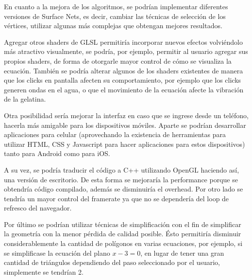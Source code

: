 \documentclass[12pt]{article}
\begin{document}
En cuanto a la mejora de los algoritmos, se podrían implementar diferentes versiones de Surface Nets, es decir, cambiar las técnicas de selección de los vértices, utilizar algunas más complejas que obtengan mejores resultados.

Agregar otros shaders de GLSL permitiría incorporar nuevos efectos volviéndolo más atractivo visualmente, se podría, por ejemplo, permitir al usuario agregar sus propios shaders, de forma de otorgarle  mayor control de cómo se visualiza la ecuación. También se podría alterar algunos de los shaders existentes de manera que los clicks en pantalla afecten su comportamiento, por ejemplo que los clicks generen ondas en el agua, o que el movimiento de la ecuación afecte la vibración de la gelatina.

Otra posibilidad sería mejorar la interfaz en caso que se ingrese desde un teléfono, hacerla más amigable para los dispositivos móviles. Aparte se podrían desarrollar aplicaciones para celular (aprovechando la existencia de herramientas para utilizar HTML, CSS y Javascript para hacer aplicaciones para estos dispositivos) tanto para Android como para iOS. 

A su vez, se podría traducir el código a C++ utilizando OpenGL haciendo así, una versión de escritorio. De esta forma se mejoraría la performance porque se obtendría código compilado, además se disminuiría el overhead. Por otro lado se tendría un mayor control del framerate ya que no se dependería del loop de refresco del navegador.

Por último se podrían utilizar técnicas de simplificación\cite{simplificacion}\cite{realtimerendering} con el fin de simplificar la geometría con la menor pérdida de calidad posible. Ésto permitiría disminuir considerablemente la cantidad de polígonos en varias ecuaciones, por ejemplo, si se simplificase la ecuación del plano $x-3=0$, en lugar de tener una gran cantidad de triángulos dependiendo del paso seleccionado por el usuario, simplemente se tendrían 2.

\clearpage
\end{document}

